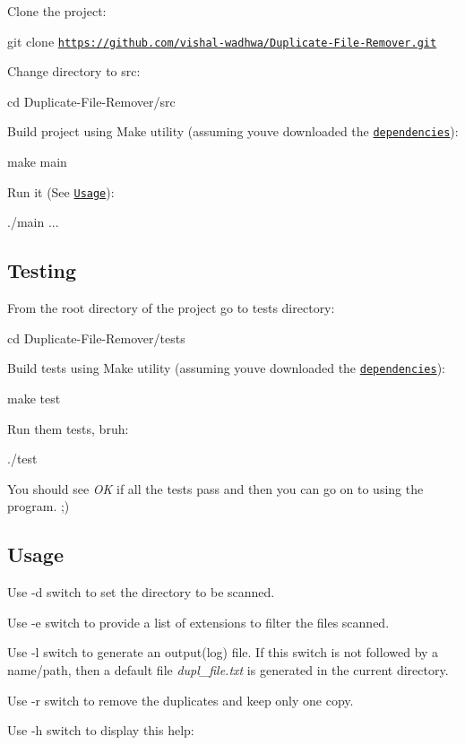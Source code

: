 \begin{DoxyEnumerate}
\item Clone the project\+:

{\ttfamily git clone \href{https://github.com/vishal-wadhwa/Duplicate-File-Remover.git}{\tt https\+://github.\+com/vishal-\/wadhwa/\+Duplicate-\/\+File-\/\+Remover.\+git}}
\item Change directory to src\+:

{\ttfamily cd Duplicate-\/\+File-\/\+Remover/src}
\item Build project using Make utility (assuming you\textquotesingle{}ve downloaded the \href{#dep}{\tt dependencies})\+:

{\ttfamily make main}
\item Run it (See \href{#use}{\tt Usage})\+:

{\ttfamily ./main ...}
\end{DoxyEnumerate}

\subsection*{Testing}


\begin{DoxyEnumerate}
\item From the root directory of the project go to tests directory\+:

{\ttfamily cd Duplicate-\/\+File-\/\+Remover/tests}
\item Build tests using Make utility (assuming you\textquotesingle{}ve downloaded the \href{#dep}{\tt dependencies})\+:

{\ttfamily make test}
\item Run them tests, bruh\+:

{\ttfamily ./test}
\end{DoxyEnumerate}

You should see {\itshape OK} if all the tests pass and then you can go on to using the program. ;)

\subsection*{\label{_use}%
Usage}


\begin{DoxyEnumerate}
\item Use {\ttfamily -\/d} switch to set the directory to be scanned.
\item Use {\ttfamily -\/e} switch to provide a list of extensions to filter the files scanned.
\item Use {\ttfamily -\/l} switch to generate an output(log) file. If this switch is not followed by a name/path, then a default file {\itshape dupl\+\_\+file.\+txt} is generated in the current directory.
\item Use {\ttfamily -\/r} switch to remove the duplicates and keep only one copy.
\item Use {\ttfamily -\/h} switch to display this help\+:
\end{DoxyEnumerate}


